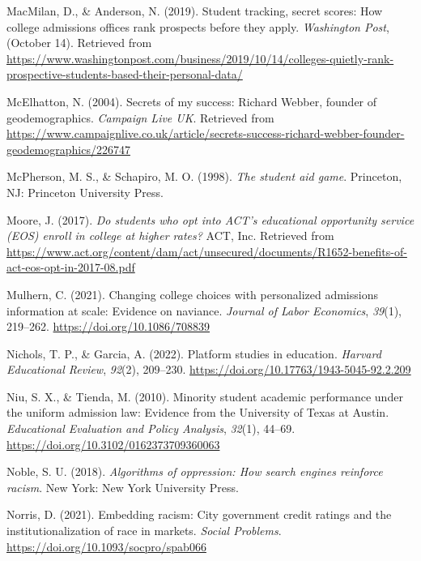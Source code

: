 \documentclass[
  12pt,
]{article}
\newlength{\cslhangindent}
\newlength{\cslentryspacingunit} %
\newenvironment{CSLReferences}[2] %
 {%
  \setlength{\parindent}{0pt}
  \ifodd #1
  \let\oldpar\par
  \def\par{\hangindent=\cslhangindent\oldpar}
  \fi
  \setlength{\parskip}{#2\cslentryspacingunit}
 }%
 {}
\begin{document}
\begin{CSLReferences}{1}{0}
\leavevmode{}%
MacMilan, D., \& Anderson, N. (2019). Student tracking, secret scores: How college admissions offices rank prospects before they apply. \emph{Washington Post}, (October 14). Retrieved from \url{https://www.washingtonpost.com/business/2019/10/14/colleges-quietly-rank-prospective-students-based-their-personal-data/}

\leavevmode{}%
McElhatton, N. (2004). Secrets of my success: {R}ichard {W}ebber, founder of geodemographics. \emph{Campaign Live UK}. Retrieved from \url{https://www.campaignlive.co.uk/article/secrets-success-richard-webber-founder-geodemographics/226747}

\leavevmode{}%
McPherson, M. S., \& Schapiro, M. O. (1998). \emph{The student aid game}. Princeton, NJ: Princeton University Press.

\leavevmode{}%
Moore, J. (2017). \emph{Do students who opt into ACT's educational opportunity service (EOS) enroll in college at higher rates?} ACT, Inc. Retrieved from \url{https://www.act.org/content/dam/act/unsecured/documents/R1652-benefits-of-act-eos-opt-in-2017-08.pdf}

\leavevmode{}%
Mulhern, C. (2021). Changing college choices with personalized admissions information at scale: Evidence on naviance. \emph{Journal of Labor Economics}, \emph{39}(1), 219--262. \url{https://doi.org/10.1086/708839}

\leavevmode{}%
Nichols, T. P., \& Garcia, A. (2022). Platform studies in education. \emph{Harvard Educational Review}, \emph{92}(2), 209--230. \url{https://doi.org/10.17763/1943-5045-92.2.209}

\leavevmode{}%
Niu, S. X., \& Tienda, M. (2010). Minority student academic performance under the uniform admission law: Evidence from the {University of Texas at Austin}. \emph{Educational Evaluation and Policy Analysis}, \emph{32}(1), 44--69. \url{https://doi.org/10.3102/0162373709360063}

\leavevmode{}%
Noble, S. U. (2018). \emph{Algorithms of oppression: How search engines reinforce racism}. New York: New York University Press.

\leavevmode{}%
Norris, D. (2021). Embedding racism: City government credit ratings and the institutionalization of race in markets. \emph{Social Problems}. \url{https://doi.org/10.1093/socpro/spab066}


\end{CSLReferences}
\end{document}
